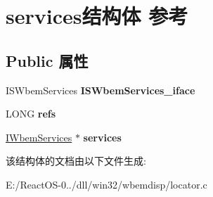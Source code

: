 \hypertarget{structservices}{}\section{services结构体 参考}
\label{structservices}
\subsection*{Public 属性}
\begin{DoxyCompactItemize}
\item 
\mbox{\label{structservices_ab611b3e820c0a9576cf22296b42d4483}} 
I\+S\+Wbem\+Services {\bfseries I\+S\+Wbem\+Services\+\_\+iface}
\item 
\mbox{\label{structservices_a5687186382ee154bbd32a89203ee462b}} 
L\+O\+NG {\bfseries refs}
\item 
\mbox{\label{structservices_ab905672a52290b5b2a3553010197d87f}} 
\hyperlink{interface_i_wbem_services}{I\+Wbem\+Services} $\ast$ {\bfseries services}
\end{DoxyCompactItemize}


该结构体的文档由以下文件生成\+:\begin{DoxyCompactItemize}
\item 
E\+:/\+React\+O\+S-\/0../dll/win32/wbemdisp/locator.\+c\end{DoxyCompactItemize}
